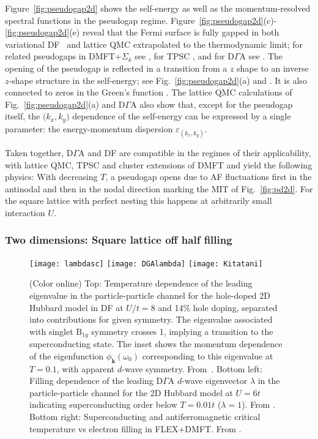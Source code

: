 \documentclass[rmp,aps,reprint,amsmath,amssymb,superscriptaddress,showpacs,nofootinbib]{revtex4-1}
\newcommand{\vc}[1]{\ensuremath{\mathbf{#1}}}
\begin{document}
Figure~\ref{fig:pseudogap2d} shows the self-energy  as well as the momentum-resolved spectral functions in  the pseudogap regime. Figure~\ref{fig:pseudogap2d}(c)-\ref{fig:pseudogap2d}(e) reveal that the  Fermi surface is fully gapped in both variational DF~\cite{Jung2010} and lattice QMC extrapolated to the thermodynamic limit; for related pseudogaps in  DMFT+$\Sigma_{k}$ see , for TPSC , and for  D$\Gamma$A see . The opening of the pseudogap is reflected in a transition from a $z$ shape to an inverse $z$-shape structure in the self-energy; see Fig.~\ref{fig:pseudogap2d}(a) and . It is also connected to zeros in the Green's function \cite{Sakai2009}. The lattice QMC calculations of Fig.~\ref{fig:pseudogap2d}(a) and D$\Gamma$A also show that, except for the pseudogap itself, the $({ k_x},{ k_y)}$ dependence of the self-energy can be expressed by a single parameter: the energy-momentum dispersion $\varepsilon_{({ k_x},{ k_y})}$.

Taken together, D$\Gamma$A and DF  are compatible in the regimes of their applicability, with lattice QMC, TPSC and cluster extensions of DMFT and yield the following physics: With decreasing $T$, a pseudogap opens due to  AF fluctuations first in the antinodal and then in the nodal direction  \cite{Schaefer2015-3} marking the MIT of Fig.~\ref{fig:pd2d}. For the square lattice with perfect nesting this happens at arbitrarily small interaction $U$.

\subsubsection{Two dimensions: Square lattice off half filling}
\label{sec:2dhubbouthalf}

\begin{figure}[t]
\begin{center}
  \texttt{[image: lambdasc]}
  \texttt{[image: DGAlambda]}
  \texttt{[image: Kitatani]} 
\end{center}
    \caption{(Color online) Top: Temperature dependence of the leading eigenvalue in the particle-particle channel for the hole-doped 2D Hubbard model in DF at $U/t=8$ and 14\% hole doping, separated into contributions for given symmetry. The eigenvalue associated with singlet B$_{1g}$ symmetry crosses 1, implying a transition to the superconducting state. The inset shows the momentum dependence of the eigenfunction $\phi_{\vc{k}}(\omega_{0})$ corresponding to this eigenvalue at $T=0.1$, with apparent $d$-wave symmetry. From~. Bottom left:  Filling dependence of the leading D$\Gamma$A  $d$-wave eigenvector $\lambda$ in the particle-particle channel for the 2D Hubbard model  at $U=6t$ indicating superconducting order below $T=0.01 t$ ($\lambda=1$). From . Bottom right: Superconducting and antiferromagnetic critical temperature vs electron filling in FLEX+DMFT. From .}
  \label{fig:lambdasc}
\end{figure}
\end{document}
